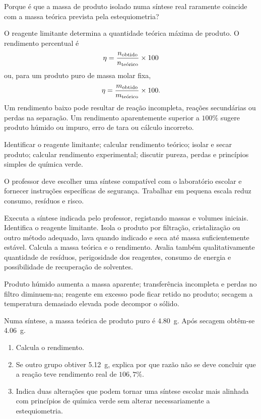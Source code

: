 \documentclass[11pt,a4paper,openany]{book}
\newcounter{exercicio}[chapter]
\renewcommand{\theexercicio}{\thechapter.\arabic{exercicio}}
\newenvironment{exercicio}[1][]%
{\refstepcounter{exercicio}%
\begin{tcolorbox}[breakable,colback=white,colframe=eublue!70,
 title={Exercício \theexercicio\if\relax\detokenize{#1}\relax\else\ --- #1\fi},fonttitle=\bfseries]}%
{\end{tcolorbox}}
\begin{document}
\begin{questao}
Porque é que a massa de produto isolado numa síntese real raramente coincide com a massa teórica prevista pela estequiometria?
\end{questao}

\begin{fundamento}
O reagente limitante determina a quantidade teórica máxima de produto. O rendimento percentual é
\[
\eta=\frac{n_{\rm obtido}}{n_{\text{teórico}}}\times100
\]
ou, para um produto puro de massa molar fixa,
\[
\eta=\frac{m_{\rm obtido}}{m_{\text{teórico}}}\times100.
\]
Um rendimento baixo pode resultar de reação incompleta, reações secundárias ou perdas na separação. Um rendimento aparentemente superior a $100\%$ sugere produto húmido ou impuro, erro de tara ou cálculo incorreto.
\end{fundamento}

\begin{objetivos}
Identificar o reagente limitante; calcular rendimento teórico; isolar e secar produto; calcular rendimento experimental; discutir pureza, perdas e princípios simples de química verde.
\end{objetivos}

\begin{seguranca}
O professor deve escolher uma síntese compatível com o laboratório escolar e fornecer instruções específicas de segurança. Trabalhar em pequena escala reduz consumo, resíduos e risco.
\end{seguranca}

\begin{metodo}
Executa a síntese indicada pelo professor, registando massas e volumes iniciais. Identifica o reagente limitante. Isola o produto por filtração, cristalização ou outro método adequado, lava quando indicado e seca até massa suficientemente estável. Calcula a massa teórica e o rendimento. Avalia também qualitativamente quantidade de resíduos, perigosidade dos reagentes, consumo de energia e possibilidade de recuperação de solventes.
\end{metodo}

\begin{erros}
Produto húmido aumenta a massa aparente; transferência incompleta e perdas no filtro diminuem-na; reagente em excesso pode ficar retido no produto; secagem a temperatura demasiado elevada pode decompor o sólido.
\end{erros}

\begin{exercicio}[Rendimento e diagnóstico]
Numa síntese, a massa teórica de produto puro é \SI{4.80}{g}. Após secagem obtêm-se \SI{4.06}{g}.
\begin{enumerate}[label=\alph*)]
\item Calcula o rendimento.
\item Se outro grupo obtiver \SI{5.12}{g}, explica por que razão não se deve concluir que a reação teve rendimento real de $106,7\%$.
\item Indica duas alterações que podem tornar uma síntese escolar mais alinhada com princípios de química verde sem alterar necessariamente a estequiometria.
\end{enumerate}
\end{exercicio}
\end{document}
